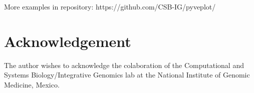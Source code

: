 \documentclass{bioinfo}
\begin{document}
More examples in repository: https://github.com/CSB-IG/pyveplot/



\section*{Acknowledgement}
The author wishes to acknowledge the colaboration of the Computational and Systems
Biology/Integrative Genomics lab at the National Institute of Genomic
Medicine, Mexico.



\end{document}
